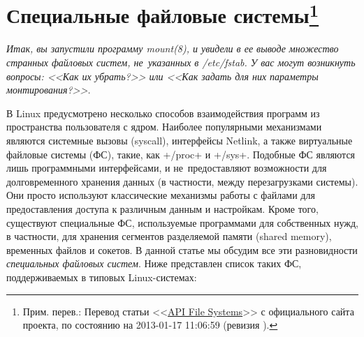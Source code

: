 \documentclass[10pt,oneside,a4paper]{article}
\newcommand{\sfnote}[1]{\texorpdfstring{\protect\footnote%
	{Прим. перев.: #1}}{}}
\begin{document}
\section{Специальные файловые системы\sfnote{Перевод статьи
<<\href{http://www.freedesktop.org/wiki/Software/systemd/APIFileSystems}{API
File Systems}>> с официального сайта проекта, по состоянию на 2013-01-17
11:06:59 (ревизия \No14).}}

\emph{Итак, вы запустили программу mount(8), и увидели в ее выводе множество
странных файловых систем, не~указанных в /etc/fstab. У вас могут возникнуть
вопросы: <<Как их убрать?>> или <<Как задать для них параметры монтирования?>>.}

В Linux предусмотрено несколько способов взаимодействия программ из пространства
пользователя с ядром. Наиболее популярными механизмами являются системные вызовы
(syscall), интерфейсы Netlink, а также виртуальные файловые системы (ФС), такие,
как +/proc+ и +/sys+. Подобные ФС являются лишь программными интерфейсами, и
не~предоставляют возможности для долговременного хранения данных (в частности,
между перезагрузками системы). Они просто используют классические механизмы
работы с файлами для предоставления доступа к различным данным и настройкам.
Кроме того, существуют специальные ФС, используемые программами для собственных
нужд, в частности, для хранения сегментов разделяемой памяти (shared memory),
временных файлов и сокетов. В данной статье мы обсудим все эти разновидности
\emph{специальных файловых систем}. Ниже представлен список таких ФС,
поддерживаемых в типовых Linux-системах:
\end{document}
